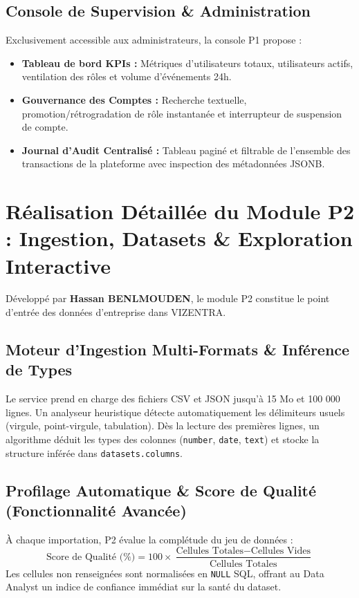 \documentclass[11pt,a4paper]{article}
\begin{document}
\subsection{Console de Supervision \& Administration}
Exclusivement accessible aux administrateurs, la console P1 propose :
\begin{itemize}[leftmargin=1.5cm, label=\textcolor{techblue}{\textbullet}]
    \item \textbf{Tableau de bord KPIs :} Métriques d'utilisateurs totaux, utilisateurs actifs, ventilation des rôles et volume d'événements 24h.
    \item \textbf{Gouvernance des Comptes :} Recherche textuelle, promotion/rétrogradation de rôle instantanée et interrupteur de suspension de compte.
    \item \textbf{Journal d'Audit Centralisé :} Tableau paginé et filtrable de l'ensemble des transactions de la plateforme avec inspection des métadonnées JSONB.
\end{itemize}

\section{Réalisation Détaillée du Module P2 : Ingestion, Datasets \& Exploration Interactive}

Développé par \textbf{Hassan BENLMOUDEN}, le module P2 constitue le point d'entrée des données d'entreprise dans VIZENTRA.

\subsection{Moteur d'Ingestion Multi-Formats \& Inférence de Types}
Le service prend en charge des fichiers CSV et JSON jusqu'à 15 Mo et 100 000 lignes. Un analyseur heuristique détecte automatiquement les délimiteurs usuels (virgule, point-virgule, tabulation). Dès la lecture des premières lignes, un algorithme déduit les types des colonnes (\texttt{number}, \texttt{date}, \texttt{text}) et stocke la structure inférée dans \texttt{datasets.columns}.

\subsection{Profilage Automatique \& Score de Qualité (Fonctionnalité Avancée)}
À chaque importation, P2 évalue la complétude du jeu de données :
\begin{equation}
    \text{Score de Qualité (\%)} = 100 \times \frac{\text{Cellules Totales} - \text{Cellules Vides}}{\text{Cellules Totales}}
\end{equation}
Les cellules non renseignées sont normalisées en \texttt{NULL} SQL, offrant au Data Analyst un indice de confiance immédiat sur la santé du dataset.
\end{document}
